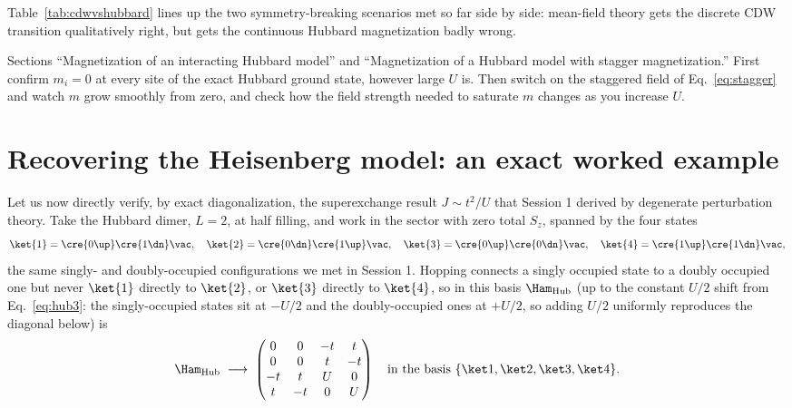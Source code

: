 \documentclass[all_sessions.tex]{subfiles}
\begin{document}
Table~\ref{tab:cdwvshubbard} lines up the two symmetry-breaking scenarios met so far side by
side: mean-field theory gets the discrete CDW transition qualitatively right, but gets the
continuous Hubbard magnetization badly wrong.

\begin{notebook}
Sections ``Magnetization of an interacting Hubbard model'' and ``Magnetization of a Hubbard model
with stagger magnetization.'' First confirm $m_i=0$ at every site of the exact Hubbard ground
state, however large $U$ is. Then switch on the staggered field of Eq.~\eqref{eq:stagger} and watch
$m$ grow smoothly from zero, and check how the field strength needed to saturate $m$ changes as you
increase $U$.
\end{notebook}

\section{Recovering the Heisenberg model: an exact worked example}
\label{sec:heisrecover}
Let us now directly verify, by exact diagonalization, the superexchange result $J \sim t^2/U$ that
Session 1 derived by degenerate perturbation theory. Take the Hubbard dimer, $L=2$, at half
filling, and work in the sector with zero total $S_z$, spanned by the four states
\begin{equation}
  \ket{1} = \cre{0\up}\cre{1\dn}\vac, \quad
  \ket{2} = \cre{0\dn}\cre{1\up}\vac, \quad
  \ket{3} = \cre{0\up}\cre{0\dn}\vac, \quad
  \ket{4} = \cre{1\up}\cre{1\dn}\vac,
\end{equation}
the same singly- and doubly-occupied configurations we met in Session 1. Hopping connects a singly
occupied state to a doubly occupied one but never $\ket{1}$ directly to $\ket{2}$, or $\ket{3}$
directly to $\ket{4}$, so in this basis $\Ham_{\mathrm{Hub}}$ (up to the constant $U/2$ shift from
Eq.~\eqref{eq:hub3}: the singly-occupied states sit at $-U/2$ and the doubly-occupied ones at
$+U/2$, so adding $U/2$ uniformly reproduces the diagonal below) is
\begin{equation}
  \Ham_{\mathrm{Hub}} \;\longrightarrow\;
  \begin{pmatrix} 0 & 0 & -t & t \\ 0 & 0 & t & -t \\ -t & t & U & 0 \\ t & -t & 0 & U\end{pmatrix}
  \quad\text{in the basis } \{\ket1,\ket2,\ket3,\ket4\}.
\end{equation}
\end{document}

